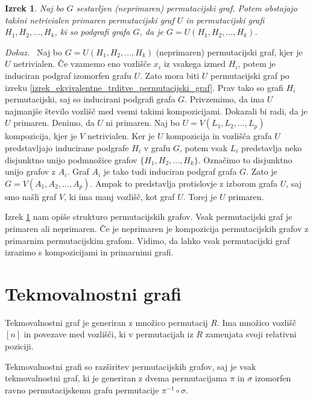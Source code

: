 \documentclass[a4paper, 12pt]{book}
\newtheorem{izrek}{Izrek}[chapter]
\newenvironment{dokaz}{\emph{Dokaz.}\ }{\hspace{\fill}{$\Box$}}
\begin{document}
\begin{izrek}
\label{izrek_neprimaren_graf_je_kompozicija_z_primarnim}
    Naj bo $G$ sestavljen (neprimaren) permutacijski graf. Potem obstajajo takšni netrivialen primaren permutacijski graf $U$ in permutacijski grafi $H_1, H_2, \dots, H_k$, ki so podgrafi grafa $G$, da je $G = U(H_1, H_2, \dots, H_k)$.
\end{izrek}
\begin{dokaz}
    Naj bo $G = U(H_1, H_2, \dots, H_k)$ (neprimaren) permutacijski graf, kjer je $U$ netrivialen. Če vzamemo eno vozlišče $x_i$ iz vsakega izmed $H_i$, potem je induciran podgraf izomorfen grafu $U$. Zato mora biti $U$ permutacijski graf po izreku \ref{izrek_ekvivalentne_trditve_permutacijski_graf}. Prav tako so grafi $H_i$ permutacijski, saj so inducirani podgrafi grafa $G$. Privzemimo, da ima $U$ najmanjše število vozlišč med vsemi takimi kompozicijami. Dokazali bi radi, da je $U$ primaren. Denimo, da $U$ ni primaren. Naj bo $U = V(L_1, L_2, \dots, L_p)$ kompozicija, kjer je $V$ netrivialen. Ker je $U$ kompozicija in vozlišča grafa $U$ predstavljajo inducirane podgrafe $H_i$ v grafu $G$, potem vsak $L_i$ predstavlja neko disjunktno unijo podmnožice grafov $\{ H_1, H_2, \dots, H_k \}$. Označimo to disjunktno unijo grafov z $A_i$. Graf $A_i$ je tako tudi induciran podgraf grafa $G$. Zato je $G = V(A_1, A_2, \dots, A_p)$. Ampak to predstavlja protislovje z izborom grafa $U$, saj smo našli graf $V$, ki ima manj vozlišč, kot graf $U$. Torej je $U$ primaren.
\end{dokaz}

Izrek \ref{izrek_neprimaren_graf_je_kompozicija_z_primarnim} nam opiše strukturo permutacijskih grafov. Vsak permutacijski graf je primaren ali neprimaren. Če je neprimaren je kompozicija permutacijskih grafov z primarnim permutacijskim grafom. Vidimo, da lahko vsak permutacijski graf izrazimo s kompozicijami in primarnimi grafi.


\chapter{ Tekmovalnostni grafi }

Tekmovalnostni graf je generiran z množico permutacij $R$. Ima množico vozlišč $[n]$ in povezave med vozlišči, ki v permutacijah iz $R$ zamenjata svoji relativni poziciji.

Tekmovalnostni grafi so razširitev permutacijskih grafov, saj je vsak tekmovalnostni graf, ki je generiran z dvema permutacijama $\pi$ in $\sigma$ izomorfen ravno permutacijskemu grafu permutacije $\pi^{-1} \circ \sigma$. 
\end{document}
